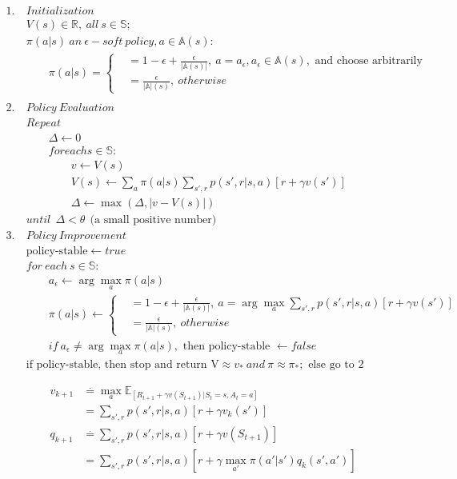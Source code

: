 \documentclass{article}
\begin{document}
\[
  \begin{aligned}
    1. \ & Initialization\\
    & V(s) \in \mathbb{R}, \ all \ s \in \mathbb{S}; \\
    & \pi(a|s) \ an \ \epsilon-soft \ policy, a \in \mathbb{A}(s):\\
    &\qquad \pi(a|s) =\left\{
            \begin{aligned}
               &= 1 - \epsilon + \frac {\epsilon} {|\mathbb{A}(s)|},
                  \ a = a_{\epsilon}, a_{\epsilon} \in \mathbb{A}(s), \text{ and choose arbitrarily } \\
               &= \frac {\epsilon} {|\mathbb{A}|(s)}, \ otherwise
            \end{aligned}
            \right.\\
    \\
    2. \ & Policy \ Evaluation\\
    &Repeat\\
    &\qquad \Delta \leftarrow 0\\
    &\qquad for each s \in \mathbb{S}:\\
    &\qquad \qquad v \leftarrow V(s)\\
    &\qquad \qquad V(s) \leftarrow \sum_a \pi(a|s)\sum_{s', r} p(s',r|s,a)[r + \gamma v(s')] \\
    &\qquad \qquad \Delta \leftarrow \max (\Delta, |v - V(s)|)\\
    &until \ \ \Delta < \theta \ \ \text{(a small positive number)}
    \\
    3. \ & Policy \ Improvement\\
    &\text{policy-stable} \leftarrow true\\
    &for \ each \ s \in \mathbb{S}:\\
    &\qquad a_{\epsilon} \leftarrow \arg\max_a \pi(a|s)\\
    &\qquad \pi(a|s) \leftarrow \left\{
      \begin{aligned}
        &= 1 - \epsilon + \frac {\epsilon} {|\mathbb{A}(s)|},
               \ a = \arg\max_a \sum_{s', r} p(s',r|s,a)[r + \gamma v(s')] \\
        &= \frac {\epsilon} {|\mathbb{A}|(s)}, \ otherwise
      \end{aligned}
    \right.\\
    &\qquad if \ a_{\epsilon} \not= \arg\max_a \pi(a|s), \text { then policy-stable } \leftarrow false \\
    &\text {if policy-stable, then stop and return V}  \approx v_* \ and \ \pi \approx \pi_*; \text { else go to 2}
  \end{aligned}
\]

\[
  \begin{aligned}
    v_{k+1} & \overset{.}{=} \max_a \mathbb{E}_[ R_{t+1} + \gamma v(S_{t+1})| S_{t}=s, A_{t}=a]\\
    &= \sum_{s',r}p(s',r|s,a)[r+\gamma v_k(s')]\\
    q_{k+1} & \overset{.}{=} \sum_{s',r}p(s',r|s,a)[r + \gamma v(S_{t+1})]\\
    &= \sum_{s',r}p(s',r|s,a)[r + \gamma  \max_{a'} \pi(a'|s')q_k(s',a')]
  \end{aligned}
\]
\end{document}
